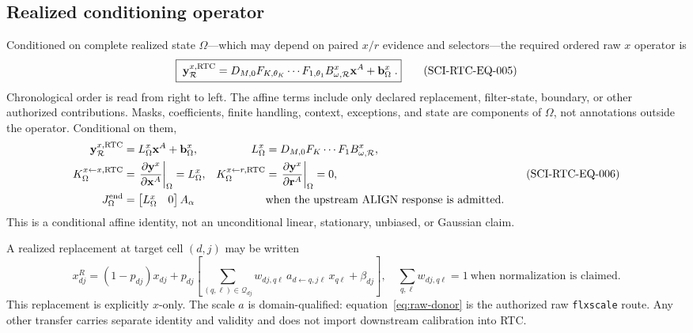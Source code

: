 \subsection{Realized conditioning operator}

Conditioned on complete realized state $\Omega$---which may depend on paired
$x/r$ evidence and selectors---the required ordered raw $x$ operator is
\begin{equation}
 \boxed{\;
 \mathbf y^{x,\rm RTC}_{\mathcal R}=D_{M,0}
 F_{K,\theta_K}\cdots F_{1,\theta_1}
 B^x_{\omega,\mathcal R}
 \mathbf x^{A}
 +\mathbf b^x_{\Omega}\; .}
 \tag{SCI-RTC-EQ-005}\label{eq:complete-operator}
\end{equation}
Chronological order is read from right to left.  The affine terms include
only declared replacement, filter-state, boundary, or other
authorized contributions.  Masks, coefficients, finite handling, context,
exceptions, and state are components of $\Omega$, not annotations outside
the operator.  Conditional on them,
\begin{equation}
 \begin{aligned}
 \mathbf y^{x,\rm RTC}_{\mathcal R}
   &=L^x_\Omega\mathbf x^{A}+\mathbf b^{x}_\Omega,
 &L^x_\Omega&=D_{M,0}F_K\cdots F_1B^x_{\omega,\mathcal R},\\
 K^{x\leftarrow x,\rm RTC}_\Omega
   &=\left.\frac{\partial\mathbf y^x}{\partial\mathbf x^A}\right|_\Omega=L^x_\Omega,
 &K^{x\leftarrow r,\rm RTC}_\Omega
   &=\left.\frac{\partial\mathbf y^x}{\partial\mathbf r^A}\right|_\Omega=0,\\
 J^{\rm end}_\Omega
   &=\begin{bmatrix}L^x_\Omega&0\end{bmatrix}A_\alpha
 &&\text{when the upstream ALIGN response is admitted.}
 \end{aligned}
 \tag{SCI-RTC-EQ-006}\label{eq:affine-operator}
\end{equation}
This is a conditional affine identity, not an unconditional linear,
stationary, unbiased, or Gaussian claim.

A realized replacement at target cell $(d,j)$ may be written
\begin{equation}
 x^R_{dj}=(1-p_{dj})x_{dj}
 +p_{dj}\left[
 \sum_{(q,\ell)\in\mathcal Q_{dj}}
 w_{dj,q\ell}\,a_{d\leftarrow q,j\ell}\,x_{q\ell}
 +\beta_{dj}\right],
 \quad
 \sum_{q,\ell}w_{dj,q\ell}=1
 \ \text{when normalization is claimed}.
 \tag{SCI-RTC-EQ-007}\label{eq:replacement}
\end{equation}
This replacement is explicitly $x$-only.  The scale $a$ is domain-qualified:
equation~\eqref{eq:raw-donor} is the
authorized raw \texttt{flxscale} route.  Any other transfer carries separate
identity and validity and does not import downstream calibration into RTC.


